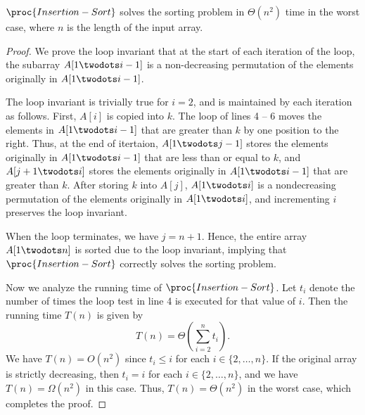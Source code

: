 \begin{theorem}
  $\proc{Insertion-Sort}$ solves the sorting problem in $\Theta(n^2)$ time in
  the worst case, where $n$ is the length of the input array.
\end{theorem}
\begin{proof}
  We prove the loop invariant that at the start of each iteration of the \For
  loop, the subarray $A[1 \twodots i-1]$ is a non-decreasing permutation of the
  elements originally in $A[1 \twodots i-1]$.

  The loop invariant is trivially true for $i = 2$, and is maintained by each
  iteration as follows.
  First, $A[i]$ is copied into $k$.
  The \While loop of lines 4 -- 6 moves the elements in $A[1 \twodots i-1]$
  that are greater than $k$ by one position to the right.
  Thus, at the end of itertaion, $A[1 \twodots j-1]$ stores the elements
  originally in $A[1 \twodots i-1]$ that are less than or equal to $k$, and
  $A[j+1 \twodots i]$ stores the elements originally in $A[1 \twodots i-1]$
  that are greater than $k$.
  After storing $k$ into $A[j]$, $A[1 \twodots i]$ is a nondecreasing
  permutation of the elements originally in $A[1 \twodots i]$, and incrementing
  $i$ preserves the loop invariant.

  When the \For loop terminates, we have $j = n + 1$.
  Hence, the entire array $A[1 \twodots n]$ is sorted due to the loop
  invariant, implying that $\proc{Insertion-Sort}$ correctly solves the sorting
  problem.

  Now we analyze the running time of $\proc{Insertion-Sort}$.
  Let $t_i$ denote the number of times the \While loop test in line 4 is
  executed for that value of $i$.
  Then the running time $T(n)$ is given by
  \begin{equation*}
    T(n) = \Theta\left(\sum_{i=2}^n t_i\right).
  \end{equation*}
  We have $T(n) = O(n^2)$ since $t_i \leq i$ for each $i \in \{2, \dots, n\}$.
  If the original array is strictly decreasing, then $t_i = i$ for each $i \in
  \{2, \dots, n\}$, and we have $T(n) = \Omega(n^2)$ in this case.
  Thus, $T(n)  = \Theta(n^2)$ in the worst case, which completes the proof.
\end{proof}
